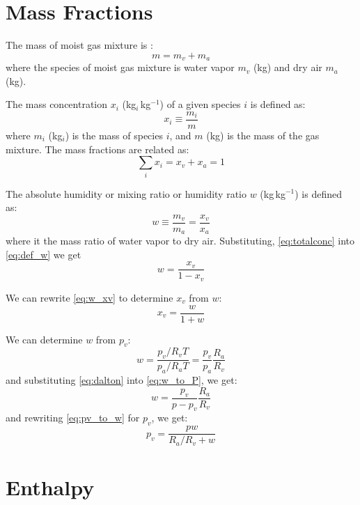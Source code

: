 \section*{Mass Fractions}

The mass of moist gas mixture is :
\begin{equation}
m = m_v + m_a
\end{equation}
where the species of moist gas mixture is water vapor $m_v$ (kg) and dry air $m_a$ (kg).

The mass concentration $x_i$ (kg$_i$\,kg$^{-1}$) of a given species $i$ is defined as:
\begin{equation}
x_i \equiv \frac{m_i}{m}
\end{equation}
where $m_i$ (kg$_i$) is the mass of species $i$, and $m$ (kg) is the mass of the gas mixture. The mass fractions are related as:
\begin{equation}
\sum_i x_i = x_v + x_a = 1
\label{eq:totalconc}
\end{equation}

The absolute humidity or mixing ratio or humidity ratio $w$ (kg\,kg$^{-1}$) is defined as:
\begin{equation}
w \equiv \frac{m_v}{m_a} = \frac{x_v}{x_a}
\label{eq:def_w}
\end{equation}
where it the mass ratio of water vapor to dry air. Substituting, \ref{eq:totalconc} into \ref{eq:def_w} we get
\begin{equation}
w = \frac{x_v}{1 - x_v}
\label{eq:w_xv}
\end{equation}

We can rewrite \ref{eq:w_xv} to determine $x_v$ from $w$:
\begin{equation}
x_v = \frac{w}{1 + w}
\label{eq:xv_w}
\end{equation}

We can determine $w$ from $p_v$:
\begin{equation}
w = \frac{p_v/R_v T}{p_a/ R_aT} = \frac{p_v}{p_a}\frac{R_a}{R_v}
\label{eq:w_to_P}
\end{equation}
and substituting \ref{eq:dalton} into \ref{eq:w_to_P}, we get:
\begin{equation}
w = \frac{p_v}{p-p_v}\frac{R_a}{R_v}
\label{eq:pv_to_w}
\end{equation}
and rewriting \ref{eq:pv_to_w} for $p_v$, we get:
\begin{equation}
p_v = \frac{p w}{R_a/R_v+w}
\label{eq:w_to_pv}
\end{equation}

\section*{Enthalpy}

